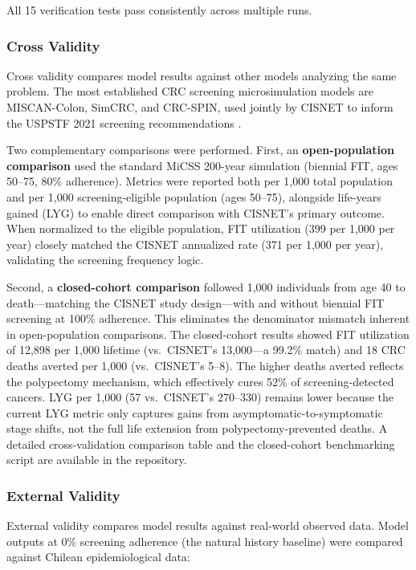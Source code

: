\documentclass[sn-mathphys-num]{sn-jnl}%
\theoremstyle{thmstyleone}%
\theoremstyle{thmstyletwo}%
\theoremstyle{thmstylethree}%
\begin{document}
All 15 verification tests pass consistently across multiple runs.

\subsubsection{Cross Validity}

Cross validity compares model results against other models analyzing the same problem. The most established CRC screening microsimulation models are MISCAN-Colon, SimCRC, and CRC-SPIN, used jointly by CISNET to inform the USPSTF 2021 screening recommendations \cite{knudsen_colorectal_2021}.

Two complementary comparisons were performed. First, an \textbf{open-population comparison} used the standard MiCSS 200-year simulation (biennial FIT, ages 50--75, 80\% adherence). Metrics were reported both per 1,000 total population and per 1,000 screening-eligible population (ages 50--75), alongside life-years gained (LYG) to enable direct comparison with CISNET's primary outcome. When normalized to the eligible population, FIT utilization (399 per 1,000 per year) closely matched the CISNET annualized rate (371 per 1,000 per year), validating the screening frequency logic.

Second, a \textbf{closed-cohort comparison} followed 1,000 individuals from age 40 to death---matching the CISNET study design---with and without biennial FIT screening at 100\% adherence. This eliminates the denominator mismatch inherent in open-population comparisons. The closed-cohort results showed FIT utilization of 12,898 per 1,000 lifetime (vs.\ CISNET's 13,000---a 99.2\% match) and 18 CRC deaths averted per 1,000 (vs.\ CISNET's 5--8). The higher deaths averted reflects the polypectomy mechanism, which effectively cures 52\% of screening-detected cancers. LYG per 1,000 (57 vs.\ CISNET's 270--330) remains lower because the current LYG metric only captures gains from asymptomatic-to-symptomatic stage shifts, not the full life extension from polypectomy-prevented deaths. A detailed cross-validation comparison table and the closed-cohort benchmarking script are available in the repository.

\subsubsection{External Validity}

External validity compares model results against real-world observed data. Model outputs at 0\% screening adherence (the natural history baseline) were compared against Chilean epidemiological data:
\end{document}
